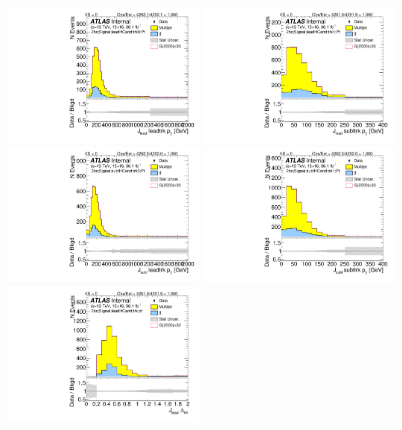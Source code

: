 \begin{figure}[htbp!]
\begin{center}
\includegraphics[angle=270, width=0.45\textwidth]{./figures/boosted/Signal/b77_TwoTag_split_Signal_leadHCand_trk0_Pt_blind.pdf}
\includegraphics[angle=270, width=0.45\textwidth]{./figures/boosted/Signal/b77_TwoTag_split_Signal_leadHCand_trk1_Pt_blind.pdf}\\
\includegraphics[angle=270, width=0.45\textwidth]{./figures/boosted/Signal/b77_TwoTag_split_Signal_sublHCand_trk0_Pt_blind.pdf}
\includegraphics[angle=270, width=0.45\textwidth]{./figures/boosted/Signal/b77_TwoTag_split_Signal_sublHCand_trk1_Pt_blind.pdf}\\
\includegraphics[angle=270, width=0.45\textwidth]{./figures/boosted/Signal/b77_TwoTag_split_Signal_leadHCand_trk_dr_blind.pdf}

\end{center}
\end{figure}
